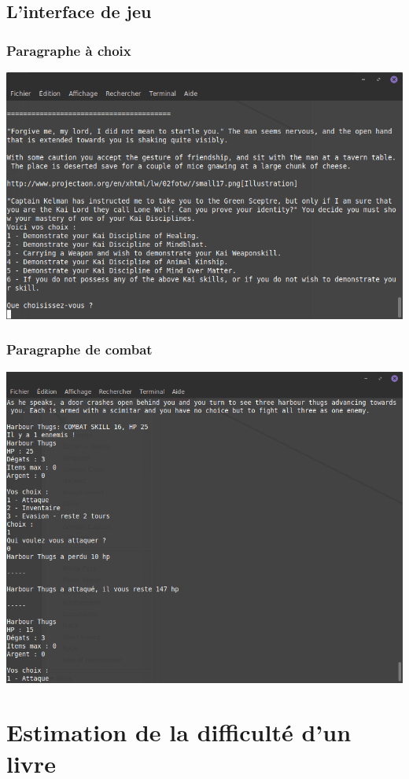 \documentclass[beamer]{BetterDocument}
\begin{document}
	\subsection{L'interface de jeu}
	\begin{frame}
		\frametitle{Paragraphe à choix}

		\center\includegraphics[width=0.8\paperwidth, keepaspectratio]{img/jeu_choix.png}
	\end{frame}

	\begin{frame}
		\frametitle{Paragraphe de combat}

		\center\includegraphics[width=0.7\paperwidth, keepaspectratio]{img/jeu_combat.png}
	\end{frame}

	\section{Estimation de la difficulté d'un livre}
\end{document}
